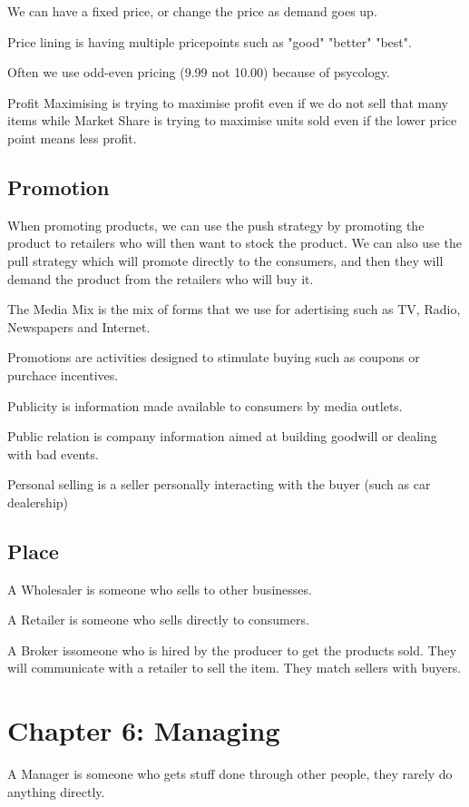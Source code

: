 \documentclass[12pt,letterpaper]{article} \usepackage{amsmath} \usepackage{graphicx} \usepackage[margin=1in]{geometry} \usepackage{longtable}  \usepackage{amssymb}
\begin{document}
		We can have a fixed price, or change the price as demand goes up.
		
		Price lining is having multiple pricepoints such as "good" "better" "best".
		
		Often we use odd-even pricing (9.99 not 10.00) because of psycology.
		
		Profit Maximising is trying to maximise profit even if we do not sell that many items while Market Share is trying to maximise units sold even if the lower price point means less profit. 
		
		\subsection{Promotion}
		When promoting products, we can use the push strategy by promoting the product to retailers who will then want to stock the product. We can also use the pull strategy which will promote directly to the consumers, and then they will demand the product from the retailers who will buy it. 
		
		The Media Mix is the mix of forms that we use for adertising such as TV, Radio, Newspapers and Internet. 
		
		Promotions are activities designed to stimulate buying such as coupons or purchace incentives. 
		
		Publicity is information made available to consumers by media outlets.
		
		Public relation is company information aimed at building goodwill or dealing with bad events. 
		
		Personal selling is a seller personally interacting with the buyer (such as car dealership)
		
		\subsection{Place}
		A Wholesaler is someone who sells to other businesses. 
		
		A Retailer is someone who sells directly to consumers. 
		
		A Broker issomeone who is hired by the producer to get the products sold. They will communicate with a retailer to sell the item. They match sellers with buyers.
		
		\section{Chapter 6: Managing}
		A Manager is someone who gets stuff done through other people, they rarely do anything directly. 
		
\end{document}
